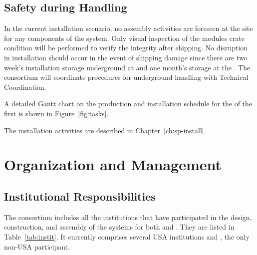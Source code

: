 \subsection{Safety during Handling} %
\label{sec:fdsp-hv-transport-safety}


In the current installation scenario, no assembly activities are foreseen at the  site for any components of the  system. Only visual inspection of the  modules crate condition will be performed to verify the integrity after shipping. %
No disruption in installation should occur in the event of shipping damage since there are two week's installation storage underground at \surf and one month's storage at the .  The  consortium will coordinate procedures for underground handling with Technical Coordination.

A detailed Gantt chart on the production and installation schedule for the  of the first  is shown in Figure~\ref{fig:tasks}.

The installation activities are described in Chapter~\ref{ch:sp-install}.




\section{Organization and Management}
\label{sec:fdsp-hv-org}


\subsection{Institutional Responsibilities}
\label{sec:fdsp-hv-org-consortium}
The  consortium %
includes all the institutions that have participated in the design, construction, and assembly of the  systems for both   and . They are listed in 
Table~\ref{tab:instit}. 
%
It currently comprises several USA institutions and , %
the only non-USA participant.  
 
